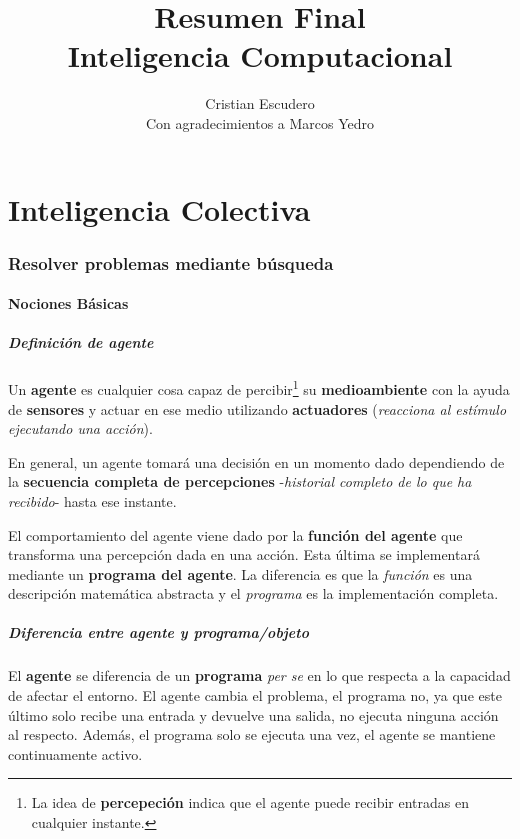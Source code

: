 \documentclass[10pt,a4paper]{article}
\author{Cristian Escudero\\\small{Con agradecimientos a Marcos Yedro}}
\title{Resumen Final\\Inteligencia Computacional}
\begin{document}
\maketitle
\part{Inteligencia Colectiva}
\setcounter{section}{0}

\section{Resolver problemas mediante búsqueda}

\subsection{Nociones Básicas}

\subsubsection{Definición de agente}

Un \textbf{agente} es cualquier cosa capaz de percibir\footnote{La idea de \textbf{percepeción} indica que el agente puede recibir entradas en cualquier instante.} su \textbf{medioambiente} con la ayuda de \textbf{sensores} y actuar en ese medio utilizando \textbf{actuadores} (\textit{reacciona al estímulo ejecutando una acción}).

En general, un agente tomará una decisión en un momento dado dependiendo de la \textbf{secuencia completa de percepciones} -\textit{historial completo de lo que ha recibido}- hasta ese instante.

El comportamiento del agente viene dado por la \textbf{función del agente} que transforma una percepción dada en una acción. Esta última se implementará mediante un \textbf{programa del agente}. La diferencia es que la \textit{función} es una descripción matemática abstracta y el \textit{programa} es la implementación completa.

\subsubsection{Diferencia entre agente y programa/objeto}

El \textbf{agente} se diferencia de un \textbf{programa} \textit{per se} en lo que respecta a la capacidad de afectar el entorno. El agente cambia el problema, el programa no, ya que este último solo recibe una entrada y devuelve una salida, no ejecuta ninguna acción al respecto. Además, el programa solo se ejecuta una vez, el agente se mantiene continuamente activo.
\end{document}
